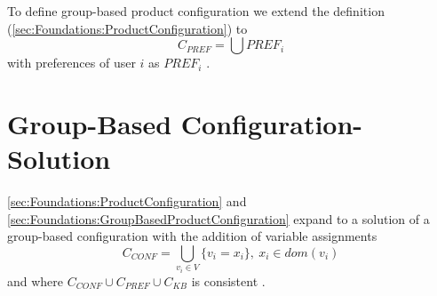 To define group-based product configuration we extend the definition (\ref{sec:Foundations:ProductConfiguration}) to 
\[ 
    C_{PREF} = \bigcup 
PREF_i \]
with preferences of user \( i \) as \( PREF_i \) \cite{ felferningGroupBasedConfiguration2016}.

\section{Group-Based Configuration-Solution}
\label{sec:Foundations:GroupBasedConfigurationSolution}

\ref{sec:Foundations:ProductConfiguration} and \ref{sec:Foundations:GroupBasedProductConfiguration} expand to a solution of a group-based configuration with the addition of variable assignments
\[
    C_{CONF} = \bigcup_{v_i \in V} \{ v_i = x_i \}, \ x_i \in dom(v_i)
\]
and where \( C_{CONF} \cup C_{PREF} \cup C_{KB} \) is consistent \cite{ felferningGroupBasedConfiguration2016}.



